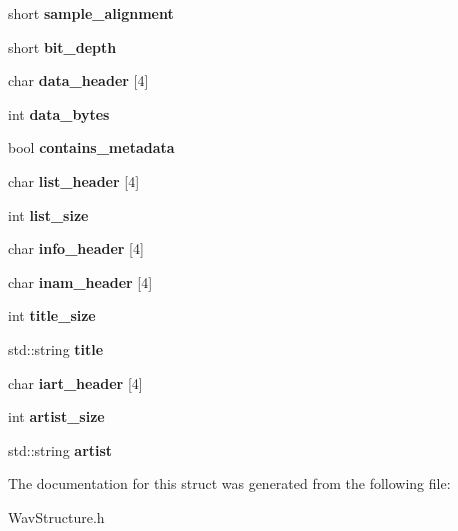 \begin{DoxyCompactItemize}
\item 
\mbox{\label{structwav__structure_ab8886e3dd8dd061e2f6c2651e799c034}} 
short {\bfseries sample\+\_\+alignment}
\item 
\mbox{\label{structwav__structure_a514c151847d41d7b657c2aec7c12211a}} 
short {\bfseries bit\+\_\+depth}
\item 
\mbox{\label{structwav__structure_a6a72dd1a17a4f8d4a0e1512f1288a438}} 
char {\bfseries data\+\_\+header} \mbox{[}4\mbox{]}
\item 
\mbox{\label{structwav__structure_ae056615eb0bf1bb3b762b3cbff6ea55b}} 
int {\bfseries data\+\_\+bytes}
\item 
\mbox{\label{structwav__structure_a69c443d365cf6798ae70dea65969a40f}} 
bool {\bfseries contains\+\_\+metadata}
\item 
\mbox{\label{structwav__structure_aa2344c148743f158a1c9a9c181684269}} 
char {\bfseries list\+\_\+header} \mbox{[}4\mbox{]}
\item 
\mbox{\label{structwav__structure_ae9b371d04aad7bc539f5ef0c0598d1d3}} 
int {\bfseries list\+\_\+size}
\item 
\mbox{\label{structwav__structure_ab872ffc9d11d00b9f7598575ded2d61c}} 
char {\bfseries info\+\_\+header} \mbox{[}4\mbox{]}
\item 
\mbox{\label{structwav__structure_aed8523be569ab3b168b23a882f4642f1}} 
char {\bfseries inam\+\_\+header} \mbox{[}4\mbox{]}
\item 
\mbox{\label{structwav__structure_a6fc9203de6b72b9e9ff3dfb3f4fc0b62}} 
int {\bfseries title\+\_\+size}
\item 
\mbox{\label{structwav__structure_a539dc3da4c269bfe7b4f599a709883bb}} 
std\+::string {\bfseries title}
\item 
\mbox{\label{structwav__structure_ac158820249e1f74a5e143e2b4036e671}} 
char {\bfseries iart\+\_\+header} \mbox{[}4\mbox{]}
\item 
\mbox{\label{structwav__structure_a8a06fb17081ac31c54fd3b68d82ad794}} 
int {\bfseries artist\+\_\+size}
\item 
\mbox{\label{structwav__structure_af4d7a03c568ab942f1ab74e3ab7d36e9}} 
std\+::string {\bfseries artist}
\end{DoxyCompactItemize}


The documentation for this struct was generated from the following file\+:\begin{DoxyCompactItemize}
\item 
Wav\+Structure.\+h\end{DoxyCompactItemize}
